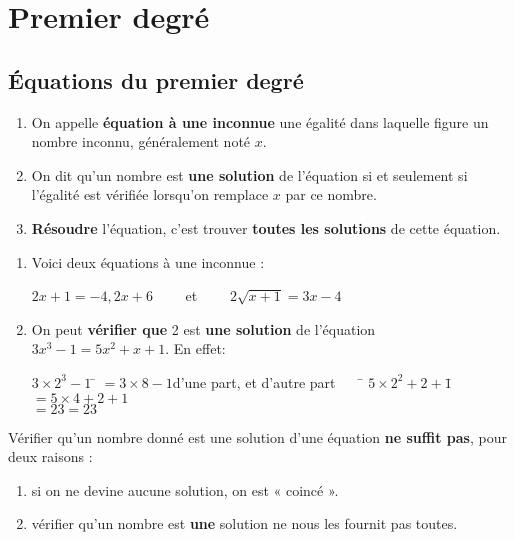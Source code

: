 \documentclass[a4paper,11pt,cours]{nsi}
\begin{document}
\chapter{Premier degré}



\section{Équations du premier degré}	
\begin{definition}[s]
	\begin{enumerate}[label=\textbullet]
		\item 	On appelle \textbf{équation à une inconnue} une égalité dans laquelle figure un nombre inconnu, généralement noté $x$.
		\item 	On dit qu'un nombre est \textbf{une solution} de l'équation si et seulement si l'égalité est vérifiée lorsqu'on remplace $x$ par ce 
		nombre.
		\item 	\textbf{Résoudre} l'équation, c'est trouver \textbf{toutes les solutions} de cette équation.
	\end{enumerate}
\end{definition}



\begin{exemple}[s]
	\begin{enumerate}[label=\textbullet]
		\item Voici deux équations à une inconnue :
		
		$2x+1=-4,2x+6\qquad$ et $\qquad2\sqrt{x+1}=3x-4$\\
		\item On peut \textbf{vérifier que} 2 est \textbf{une solution} de l'équation $3x^3-1=5x^2+x+1$. En effet:
		\begin{tabbing}
			$3\times 2^3-1$	\=	$=3\times 8-1$\qquad d'une part, et d'autre part$\qquad$\= $ 5\times 2^2+2+1$\=$=5\times 4+2+1$\\
			\>	$=23$\>\>$=23$
		\end{tabbing}
	\end{enumerate}
\end{exemple}

Vérifier qu'un nombre donné est une solution d'une équation \textbf{ne suffit pas}, pour deux raisons :
\begin{enumerate}[label=\textbullet]
	\item si on ne devine aucune solution, on est « coincé ».
	\item vérifier qu'un nombre est \textbf{une} solution ne nous les fournit pas toutes.
\end{enumerate}
\end{document}
